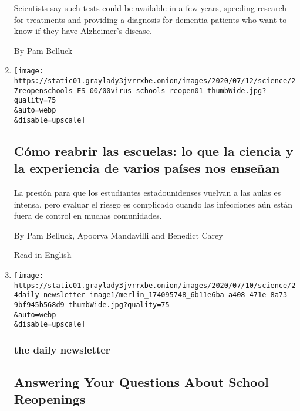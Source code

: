 \begin{enumerate}
  Scientists say such tests could be available in a few years, speeding
  research for treatments and providing a diagnosis for dementia
  patients who want to know if they have Alzheimer's disease.

  By Pam Belluck
\item
  \href{/es/2020/07/27/espanol/ciencia-y-tecnologia/regreso-a-clases-coronavirus.html}{}

  \texttt{[image: https://static01.graylady3jvrrxbe.onion/images/2020/07/12/science/27reopenschools-ES-00/00virus-schools-reopen01-thumbWide.jpg?quality=75\\\&auto=webp\\\&disable=upscale]}

  \hypertarget{cuxf3mo-reabrir-las-escuelas-lo-que-la-ciencia-y-la-experiencia-de-varios-pauxedses-nos-enseuxf1an}{%
  \subsection{Cómo reabrir las escuelas: lo que la ciencia y la
  experiencia de varios países nos
  enseñan}\label{cuxf3mo-reabrir-las-escuelas-lo-que-la-ciencia-y-la-experiencia-de-varios-pauxedses-nos-enseuxf1an}}

  La presión para que los estudiantes estadounidenses vuelvan a las
  aulas es intensa, pero evaluar el riesgo es complicado cuando las
  infecciones aún están fuera de control en muchas comunidades.

  By Pam Belluck, Apoorva Mandavilli and Benedict Carey

  \href{https://www.nytimes3xbfgragh.onion/2020/07/11/health/coronavirus-schools-reopen.html}{Read
  in English}
\item
  \href{/2020/07/24/podcasts/daily-newsletter-schools-reopening-summer-playlist.html}{}

  \texttt{[image: https://static01.graylady3jvrrxbe.onion/images/2020/07/10/science/24daily-newsletter-image1/merlin\_174095748\_6b11e6ba-a408-471e-8a73-9bf945b568d9-thumbWide.jpg?quality=75\\\&auto=webp\\\&disable=upscale]}

  \hypertarget{the-daily-newsletter}{%
  \subsubsection{the daily newsletter}\label{the-daily-newsletter}}

  \hypertarget{answering-your-questions-about-school-reopenings}{%
  \subsection{Answering Your Questions About School
  Reopenings}\label{answering-your-questions-about-school-reopenings}}


\end{enumerate}
